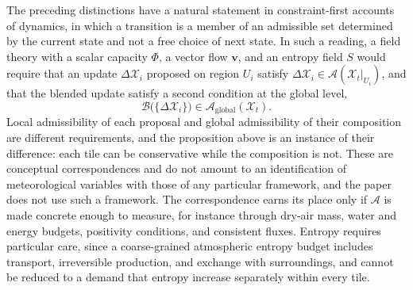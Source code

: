 \documentclass[11pt]{article}
\theoremstyle{definition}
\theoremstyle{remark}
\begin{document}
The preceding distinctions have a natural statement in constraint-first accounts of dynamics, in which a transition is a member of an admissible set determined by the current state and not a free choice of next state. In such a reading, a field theory with a scalar capacity $\Phi$, a vector flow $\mathbf v$, and an entropy field $S$ would require that an update $\Delta\mathcal X_i$ proposed on region $U_i$ satisfy $\Delta\mathcal X_i \in \mathcal A(\mathcal X_t|_{U_i})$, and that the blended update satisfy a second condition at the global level,
\begin{equation}
\mathcal B\bigl(\{\Delta\mathcal X_i\}\bigr) \in \mathcal A_{\mathrm{global}}(\mathcal X_t).
\end{equation}
Local admissibility of each proposal and global admissibility of their composition are different requirements, and the proposition above is an instance of their difference: each tile can be conservative while the composition is not. These are conceptual correspondences and do not amount to an identification of meteorological variables with those of any particular framework, and the paper does not use such a framework. The correspondence earns its place only if $\mathcal A$ is made concrete enough to measure, for instance through dry-air mass, water and energy budgets, positivity conditions, and consistent fluxes. Entropy requires particular care, since a coarse-grained atmospheric entropy budget includes transport, irreversible production, and exchange with surroundings, and cannot be reduced to a demand that entropy increase separately within every tile.
\end{document}
